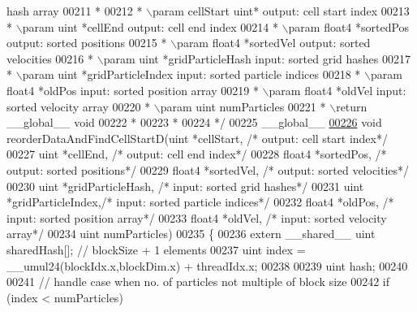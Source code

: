 \begin{DoxyCode}
{       hash array}
00211 \textcolor{comment}{ *}
00212 \textcolor{comment}{ * \(\backslash\)param cellStart uint* output: cell start index}
00213 \textcolor{comment}{ * \(\backslash\)param uint   *cellEnd output: cell end index}
00214 \textcolor{comment}{ * \(\backslash\)param float4 *sortedPos output: sorted positions}
00215 \textcolor{comment}{ * \(\backslash\)param float4 *sortedVel output: sorted velocities}
00216 \textcolor{comment}{ * \(\backslash\)param uint   *gridParticleHash input: sorted grid hashes}
00217 \textcolor{comment}{ * \(\backslash\)param uint   *gridParticleIndex input: sorted particle indices}
00218 \textcolor{comment}{ * \(\backslash\)param float4 *oldPos input: sorted position array}
00219 \textcolor{comment}{ * \(\backslash\)param float4 *oldVel input: sorted velocity array}
00220 \textcolor{comment}{ * \(\backslash\)param uint    numParticles}
00221 \textcolor{comment}{ * \(\backslash\)return \_\_global\_\_ void}
00222 \textcolor{comment}{ *}
00223 \textcolor{comment}{ *}
00224 \textcolor{comment}{ */}
00225 \_\_global\_\_
\hypertarget{particles__kernel__impl_8cuh_source_l00226}{}\hyperlink{particles__kernel__impl_8cuh_abe84636059af3ed58ef603665395e6f4}{00226} \textcolor{keywordtype}{void} reorderDataAndFindCellStartD(uint   *cellStart,        \textcolor{comment}{/* output: cell start index*/}
00227                                   uint   *cellEnd,          \textcolor{comment}{/* output: cell end index*/}
00228                                   float4 *sortedPos,        \textcolor{comment}{/* output: sorted positions*/}
00229                                   float4 *sortedVel,        \textcolor{comment}{/* output: sorted velocities*/}
00230                                   uint   *gridParticleHash, \textcolor{comment}{/* input: sorted grid hashes*/}
00231                                   uint   *gridParticleIndex,\textcolor{comment}{/* input: sorted particle indices*/}
00232                                   float4 *oldPos,           \textcolor{comment}{/* input: sorted position array*/}
00233                                   float4 *oldVel,           \textcolor{comment}{/* input: sorted velocity array*/}
00234                                   uint    numParticles)
00235 \{
00236     \textcolor{keyword}{extern} \_\_shared\_\_ uint sharedHash[];    \textcolor{comment}{// blockSize + 1 elements}
00237     uint index = \_\_umul24(blockIdx.x,blockDim.x) + threadIdx.x;
00238 
00239     uint hash;
00240 
00241     \textcolor{comment}{// handle case when no. of particles not multiple of block size}
00242     \textcolor{keywordflow}{if} (index < numParticles)

\end{DoxyCode}
